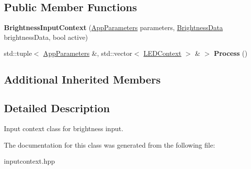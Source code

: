 \subsection*{Public Member Functions}
\begin{DoxyCompactItemize}
\item 
\mbox{\label{classBrightnessInputContext_a152a2a28efc12b3f4c9461dcadfebfe7}} 
{\bfseries Brightness\+Input\+Context} (\hyperlink{structAppParameters}{App\+Parameters} parameters, \hyperlink{structBrightnessData}{Brightness\+Data} brightness\+Data, bool active)
\item 
\mbox{\label{classBrightnessInputContext_abed6703d2d678ba74efdd635b5e39104}} 
std\+::tuple$<$ \hyperlink{structAppParameters}{App\+Parameters} \&, std\+::vector$<$ \hyperlink{classLEDContext}{L\+E\+D\+Context} $>$ \& $>$ {\bfseries Process} ()
\end{DoxyCompactItemize}
\subsection*{Additional Inherited Members}


\subsection{Detailed Description}
Input context class for brightness input. 

The documentation for this class was generated from the following file\+:\begin{DoxyCompactItemize}
\item 
inputcontext.\+hpp\end{DoxyCompactItemize}
